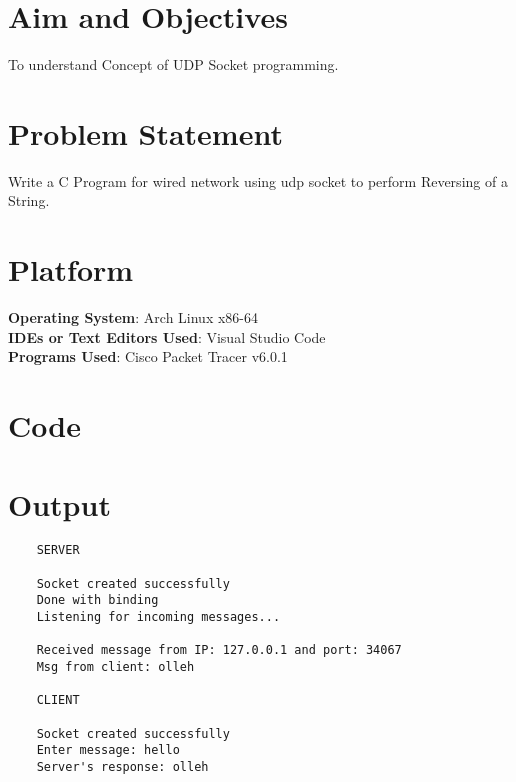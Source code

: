 \documentclass[11pt]{article}
\begin{document}
	
\tableofcontents
\thispagestyle{empty}
\clearpage


\setcounter{page}{1}

\section{Aim and Objectives}
To understand Concept of UDP Socket programming. 

\section{Problem Statement}
Write a C Program for wired network using udp socket to perform Reversing of a String. 

\section{Platform}
	\textbf{Operating System}: Arch Linux x86-64\\
	\textbf{IDEs or Text Editors Used}: Visual Studio Code\\
	\textbf{Programs Used}: Cisco Packet Tracer v6.0.1

\section{Code}




\section{Output}
\begin{verbatim}
	SERVER

	Socket created successfully
	Done with binding
	Listening for incoming messages...

	Received message from IP: 127.0.0.1 and port: 34067
	Msg from client: olleh

	CLIENT

	Socket created successfully
	Enter message: hello
	Server's response: olleh

\end{verbatim}
\end{document}

